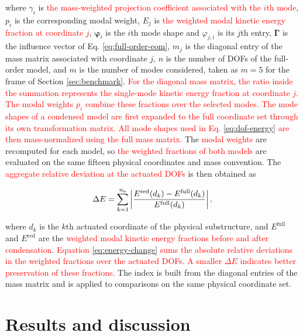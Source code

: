 \documentclass[a4paper,fleqn,review,12pt]{cas-sc}
\newcommand{\rev}[1]{\textcolor{red}{#1}}
\begin{document}
\noindent where \(\gamma_{i}\) is \rev{the mass-weighted projection coefficient associated with the \(i\)th mode}, \(p_{i}\) is the corresponding modal weight, \(E_{j}\) is \rev{the weighted modal kinetic energy fraction at coordinate \(j\)}, \(\bm{\varphi}_{i}\) is the \(i\)th mode shape and \(\varphi_{j,i}\) is its \(j\)th entry, \(\bm{\Gamma}\) is the influence vector of Eq. \eqref{eq:full-order-eom}, \(m_{j}\) is the diagonal entry of the mass matrix associated with coordinate \(j\), \(n\) is the number of DOFs of the full-order model, and \(m\) is the number of modes considered, taken as \(m=5\) for the frame of Section \ref{sec:benchmark}. \rev{For the diagonal mass matrix, the ratio inside the summation represents the single-mode kinetic energy fraction at coordinate \(j\). The modal weights \(p_i\) combine these fractions over the selected modes.} \rev{The mode shapes of a condensed model are first expanded to the full coordinate set through its own transformation matrix. All mode shapes used in Eq. \eqref{eq:dof-energy} are then mass-normalized using the full mass matrix.} The \rev{modal weights} are recomputed for each model, so \rev{the weighted fractions of both models} are evaluated on the same fifteen physical coordinates and mass convention. The \rev{aggregate relative deviation at the actuated DOFs} is then obtained as

\vspace{-3.5em}
\begin{equation}
	\Delta E=\sum_{k=1}^{n_{\mathrm{a}}}
	\left|\frac{E^{\mathrm{red}}(d_{k})-E^{\mathrm{full}}(d_{k})}{E^{\mathrm{full}}(d_{k})}\right|\rev{,}
	\label{eq:energy-change}
\end{equation}
\vspace{-3.5em}

\noindent where \(d_{k}\) is the \(k\)th actuated coordinate of the physical substructure, and \(E^{\mathrm{full}}\) and \(E^{\mathrm{red}}\) are the \rev{weighted modal kinetic energy fractions before and after condensation}. \rev{Equation \eqref{eq:energy-change} sums the absolute relative deviations in the weighted fractions over the actuated DOFs. A smaller \(\Delta E\) indicates better preservation of these fractions.} The index is built from the diagonal entries of the mass matrix and is applied to comparisons on the same physical coordinate set.




\section{Results and discussion} \label{sec5}
\end{document}
